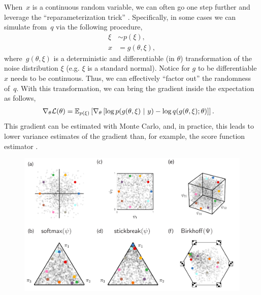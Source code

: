 \documentclass{article}
\begin{document}
When~$x$ is a continuous random variable, we can often go one step
further and leverage the ``reparameterization trick''  \citep{Salimans2013,Kingma2014,Price1958,Bonnet1964}.  Specifically,
in some cases we can simulate from~$q$ via the following procedure,
\begin{align}
\xi &\sim p(\xi),  \\
x &= g(\theta, \xi),
\end{align}
where~$g(\theta, \xi)$ is a deterministic and differentiable (in $\theta$)
transformation of the noise distribution $\xi$ (e.g. $\xi$ is a standard normal). Notice for $g$ to be differentiable $x$ needs to be continuous. Thus, we
can effectively ``factor out'' the randomness of~$q$. With this
transformation, we can bring the gradient inside the expectation as
follows,
\begin{align}
  \nabla_\theta \mathcal{L}(\theta) 
  &= \mathbb{E}_{p(\xi)} \left[ \nabla_\theta \left[\log p(g(\theta, \xi) ~\vert~ y) - \log q(g(\theta, \xi); \theta) \right] \right].
\end{align}
This gradient can be estimated with Monte Carlo, and, in practice,
this leads to lower variance estimates of the gradient than, for
example, the score function estimator \citep{Williams1992,Glynn1990}.

\begin{figure}[t]
  \centering
  \includegraphics[width=5.in]{../figures/figure1.pdf} 
  \caption{
  }
\label{fig:transforms}
\end{figure}
\end{document}

